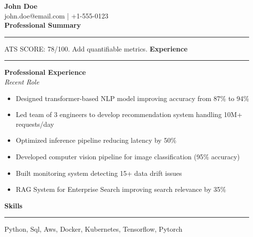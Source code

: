 \documentclass[11pt,letterpaper]{article}
\newcommand{\sectionheader}[1]{\vspace{6pt}\textbf{\large #1}\vspace{-8pt}\hrule\vspace{6pt}}
\begin{document}
\textbf{\Large John Doe}\\
john.doe@email.com | +1-555-0123\\
\vspace{8pt}
\sectionheader{Professional Summary}
ATS SCORE: 78/100. Add quantifiable metrics.
\vspace{6pt}
\sectionheader{Experience}
\textbf{Professional Experience} \hfill \\
\textit{Recent Role}\\
\begin{itemize}[leftmargin=*]
  \item Designed transformer-based NLP model improving accuracy from 87\% to 94\%
  \item Led team of 3 engineers to develop recommendation system handling 10M+ requests/day
  \item Optimized inference pipeline reducing latency by 50\%
  \item Developed computer vision pipeline for image classification (95\% accuracy)
  \item Built monitoring system detecting 15+ data drift issues
  \item RAG System for Enterprise Search improving search relevance by 35\%
\end{itemize}
\sectionheader{Skills}
Python, Sql, Aws, Docker, Kubernetes, Tensorflow, Pytorch
\end{document}
